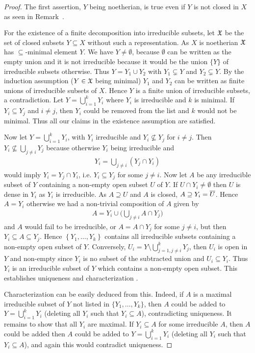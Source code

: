 \documentclass[a4paper,parskip=half,numbers=enddot, DIV=12]{scrreprt}
\begin{document}
	\begin{proof}
		The first assertion, $Y$ being noetherian, is true even if $Y$ is not closed in $X$ as seen in Remark~.
		
		For the existence of a finite decomposition into irreducible subsets, let $\mathfrak{X}$ be the set of closed subsets $Y\subseteq X$ without such a representation. As $X$ is noetherian $\mathfrak{X}$ has $\subseteq $-minimal element $Y$. We have $Y\neq \emptyset$, because $\emptyset$ can be written as the empty union and it is not irreducible because it would be the union $\{Y\}$ of irreducible subsets otherwise. Thus $Y= Y_1\cup Y_2$ with $Y_1\subsetneq Y$ and $Y_2\subsetneq Y$. By the induction assumption ($Y\in \mathfrak{X}$ being minimal) $Y_1$ and $Y_2$ can be written as finite unions of irreducible subsets of $X$. Hence $Y$ is a finite union of irreducible subsets, a contradiction. Let $Y=\bigcup_{i=1}^k Y_i$ where $Y_i$ is irreducible and $k$ is minimal. If $Y_i\subseteq Y_j$ and $i\neq j$, then $Y_i$ could be removed from the list and $k$ would not be minimal. Thus all our claims in the existence assumption are satisfied.
		
		Now let $Y=\bigcup_{i=1}^kY_i$, with $Y_i$ irreducible and $Y_i\not\subseteq Y_j$ for $i\neq j$. Then $Y_i\not\subseteq \bigcup_{j\not=i}Y_j$ because otherwise $Y_i$ being irreducible and
		\begin{align*}
			Y_i=\bigcup_{j\not=i}(Y_j\cap Y_i)
		\end{align*}
		would imply $Y_i=Y_j\cap Y_i$, i.e. $Y_i\subseteq Y_j$ for some $j\not=i$. Now let $A$ be any irreducible subset of $Y$ containing a non-empty open subset $U$ of $Y$. If $U\cap Y_i\neq \emptyset$ then $U$ is dense in $Y_i$ as $Y_i$ is irreducible. As $A\supseteq U$ and $A$ is closed, $A\supseteq Y_i = \overline U$. Hence $A=Y_i$ otherwise we had a non-trivial composition of $A$ given by 
		\begin{align*}
		A= Y_i \cup \bigg(\bigcup_{j\not=i} A\cap Y_j\bigg)
		\end{align*}
		and $A$ would fail to be irreducible, or $A=A\cap Y_j$ for some $j\not=i$, but then $Y_i\subseteq A\subseteq Y_j$. Hence $\left\{ Y_1,\ldots,Y_k\right\}$ contains all irreducible subsets containing a non-empty open subset of $Y$. Conversely, $U_i = Y\setminus \bigcup_{j=1, j\neq i}^k Y_j$, then $U_i$ is open in $Y$ and non-empty since $Y_i$ is no subset of the subtracted union and $U_i\subseteq Y_i$. Thus $Y_i$ is an irreducible subset of $Y$ which contains a non-empty open subset. This establishes uniqueness and characterization . 
		
		Characterization  can be easily deduced from this. Indeed, if $A$ is a maximal irreducible subset of $Y$ not listed in $\{Y_1,\ldots,Y_k\}$, then $A$ could be added to $Y=\bigcup_{i=1}^kY_i$ (deleting all $Y_i$ such that $Y_i\subseteq A$), contradicting uniqueness. It remains to show that all $Y_i$ are maximal. If $Y_i\subseteq A$ for some irreducible $A$, then $A$ could be added then $A$ could be added to $Y=\bigcup_{i=1}^kY_i$ (deleting all $Y_i$ such that $Y_i\subseteq A$), and again this would contradict uniqueness. 
	\end{proof}
	
\end{document}
